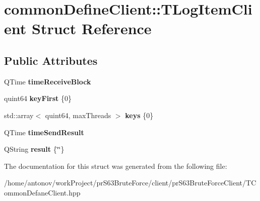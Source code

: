 \hypertarget{structcommon_define_client_1_1_t_log_item_client}{}\section{common\+Define\+Client\+:\+:T\+Log\+Item\+Client Struct Reference}
\label{structcommon_define_client_1_1_t_log_item_client}
\subsection*{Public Attributes}
\begin{DoxyCompactItemize}
\item 
\mbox{\label{structcommon_define_client_1_1_t_log_item_client_ab2a6064d43c8dbe637188b3c9b7835a9}} 
Q\+Time {\bfseries time\+Receive\+Block}
\item 
\mbox{\label{structcommon_define_client_1_1_t_log_item_client_aa8d3e11c4173fcd797ce8e8c53d93c8b}} 
quint64 {\bfseries key\+First} \{0\}
\item 
\mbox{\label{structcommon_define_client_1_1_t_log_item_client_abe6f35c52279fda23abce2af8ba3da9c}} 
std\+::array$<$ quint64, max\+Threads $>$ {\bfseries keys} \{0\}
\item 
\mbox{\label{structcommon_define_client_1_1_t_log_item_client_a39a08024bb4f93474f739c4e2636fbe8}} 
Q\+Time {\bfseries time\+Send\+Result}
\item 
\mbox{\label{structcommon_define_client_1_1_t_log_item_client_a237d46da9198f1a7ad87554186f17f20}} 
Q\+String {\bfseries result} \{\char`\"{}\char`\"{}\}
\end{DoxyCompactItemize}


The documentation for this struct was generated from the following file\+:\begin{DoxyCompactItemize}
\item 
/home/antonov/work\+Project/pr\+S63\+Brute\+Force/client/pr\+S63\+Brute\+Force\+Client/T\+Common\+Defane\+Client.\+hpp\end{DoxyCompactItemize}
